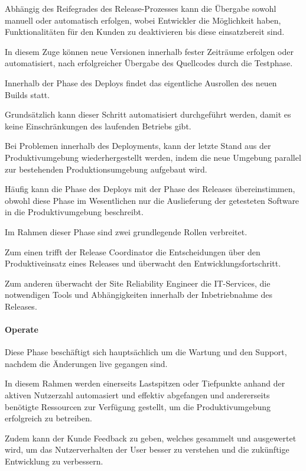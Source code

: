 Abhängig des Reifegrades des Release-Prozesses kann die Übergabe sowohl manuell oder automatisch erfolgen, wobei Entwickler die Möglichkeit haben, Funktionalitäten für den Kunden zu deaktivieren bis diese einsatzbereit sind. \cite{thedev_eight_2019}

In diesem Zuge können neue Versionen innerhalb fester Zeiträume erfolgen oder automatisiert, nach erfolgreicher Übergabe des Quellcodes durch die Testphase. \cite{thedev_eight_2019}

Innerhalb der Phase des Deploys findet das eigentliche Ausrollen des neuen Builds statt.  

Grundsätzlich kann dieser Schritt automatisiert durchgeführt werden, damit es keine Einschränkungen des laufenden Betriebs gibt. \cite{thedev_eight_2019}  

Bei Problemen innerhalb des Deployments, kann der letzte Stand aus der Produktivumgebung wiederhergestellt werden, indem die neue Umgebung parallel zur bestehenden Produktionsumgebung aufgebaut wird. 

Häufig kann die Phase des Deploys mit der Phase des Releases übereinstimmen, obwohl diese Phase im Wesentlichen nur die Auslieferung der getesteten Software in die Produktivumgebung beschreibt. \cite[S. 20]{halstenberg_devops_2020}   

Im Rahmen dieser Phase sind zwei grundlegende Rollen verbreitet. \cite[s. 20]{halstenberg_devops_2020} 

Zum einen trifft der Release Coordinator die Entscheidungen über den Produktiveinsatz eines Releases und überwacht den Entwicklungsfortschritt. 

Zum anderen überwacht der Site Reliability Engineer die IT-Services, die notwendigen Tools und Abhängigkeiten innerhalb der Inbetriebnahme des Releases. 

\paragraph{Operate}

Diese Phase beschäftigt sich hauptsächlich um die Wartung und den Support, nachdem die Änderungen live gegangen sind. 

In diesem Rahmen werden einerseits Lastspitzen oder Tiefpunkte anhand der aktiven Nutzerzahl automasiert und effektiv abgefangen und andererseits benötigte Ressourcen zur Verfügung gestellt, um die Produktivumgebung erfolgreich zu betreiben. \cite{thedev_eight_2019}    

Zudem kann der Kunde Feedback zu geben, welches gesammelt und ausgewertet wird, um das Nutzerverhalten der User besser zu verstehen und die zukünftige Entwicklung zu verbessern. 

